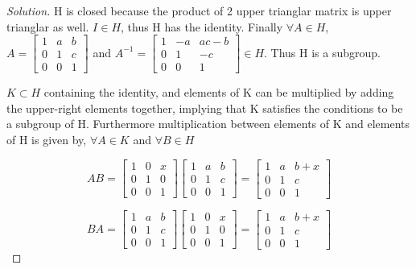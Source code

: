 \documentclass{article}
\newenvironment{solution}
{\renewcommand\qedsymbol{$\blacksquare$}\begin{proof}[Solution]}
{\end{proof}}
\begin{document}
\begin{solution}
    H is closed because the product of 2 upper trianglar matrix is upper trianglar as well. $I \in H$, thus H has the identity. Finally $\forall A \in H$, $A = \begin{bmatrix}
        1 & a & b \\ 
        0 & 1 & c \\ 
        0 & 0 & 1
    \end{bmatrix}$ and $A^{-1} = \begin{bmatrix}
        1 & -a & ac-b \\ 
        0 & 1 & -c \\ 
        0 & 0 & 1
    \end{bmatrix} \in H$. Thus H is a subgroup.

    $K \subset H$ containing the identity, and elements of K can be multiplied by adding the upper-right elements together, implying that K
    satisfies the conditions to be a subgroup of H. Furthermore multiplication between elements of K
    and elements of H is given by, $\forall A \in K$ and $\forall B \in H$

    \[AB = \begin{bmatrix}
        1 & 0 & x \\ 
        0 & 1 & 0 \\ 
        0 & 0 & 1
    \end{bmatrix}\begin{bmatrix}
        1 & a & b \\ 
        0 & 1 & c \\ 
        0 & 0 & 1
    \end{bmatrix} = \begin{bmatrix}
        1 & a & b + x \\ 
        0 & 1 & c \\ 
        0 & 0 & 1
    \end{bmatrix}\]

    \[BA = \begin{bmatrix}
        1 & a & b \\ 
        0 & 1 & c \\ 
        0 & 0 & 1
    \end{bmatrix}\begin{bmatrix}
        1 & 0 & x \\ 
        0 & 1 & 0 \\ 
        0 & 0 & 1
    \end{bmatrix} = \begin{bmatrix}
        1 & a & b + x \\ 
        0 & 1 & c \\ 
        0 & 0 & 1
    \end{bmatrix}\]


\end{solution}
\end{document}
